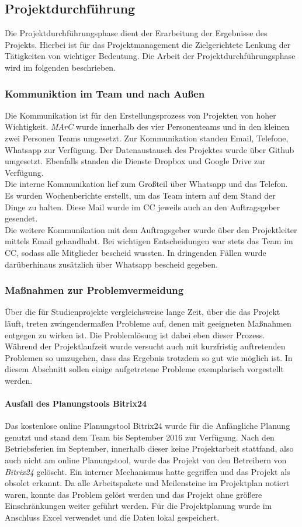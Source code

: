 \subsection{Projektdurchführung}
Die Projektdurchführungsphase dient der Erarbeitung der Ergebnisse des Projekts. Hierbei ist für das Projektmanagement die Zielgerichtete Lenkung der Tätigkeiten von wichtiger Bedeutung. Die Arbeit der Projektdurchführungsphase wird im folgenden beschrieben.
\subsubsection{Kommuniktion im Team und nach Außen}
Die Kommunikation ist für den Erstellungsprozess von Projekten von hoher Wichtigkeit.\textit{ MArC} wurde innerhalb des vier Personenteams und in den kleinen zwei Personen Teams umgesetzt. Zur Kommunikation standen Email, Telefone, Whatsapp zur Verfügung. Der Datenaustausch des Projektes wurde über Github umgesetzt. Ebenfalls standen die Dienste Dropbox und Google Drive zur Verfügung.\\
Die interne Kommunikation lief zum Großteil über Whatsapp und das Telefon. Es wurden Wochenberichte erstellt, um das Team intern auf dem Stand der Dinge zu halten. Diese Mail wurde im CC jeweils auch an den Auftragsgeber gesendet.\\
Die weitere Kommunikation mit dem Auftragsgeber wurde über den Projektleiter mittels Email gehandhabt. Bei wichtigen Entscheidungen war stets das Team im CC, sodass alle Mitglieder bescheid wussten. In dringenden Fällen wurde darüberhinaus zusätzlich über Whatsapp bescheid gegeben.

\subsubsection{Maßnahmen zur Problemvermeidung}
Über die für Studienprojekte vergleichsweise lange Zeit, über die das Projekt läuft, treten zwingendermaßen Probleme auf, denen mit geeigneten Maßnahmen entgegen zu wirken ist. Die Problemlösung ist dabei eben dieser Prozess. Während der Projektlaufzeit wurde versucht auch mit kurzfristig auftretenden Problemen so umzugehen, dass das Ergebnis trotzdem so gut wie möglich ist. In diesem Abschnitt sollen einige aufgetretene Probleme exemplarisch vorgestellt werden.

\paragraph{Ausfall des Planungstools Bitrix24} Das kostenlose online Planungstool Bitrix24 wurde für die Anfängliche Planung genutzt und stand dem Team bis September 2016 zur Verfügung. Nach den Betriebsferien im September, innerhalb dieser keine Projektarbeit stattfand, also auch nicht am online Planungstool, wurde das Projekt von den Betreibern von \textit{Bitrix24} gelöscht. Ein interner Mechanismus hatte gegriffen und das Projekt als obsolet erkannt. Da alle Arbeitspakete und Meilensteine im Projektplan notiert waren, konnte das Problem gelöst werden und das Projekt ohne größere Einschränkungen weiter geführt werden. Für die Projektplanung wurde im Anschluss Excel verwendet und die Daten lokal gespeichert.

